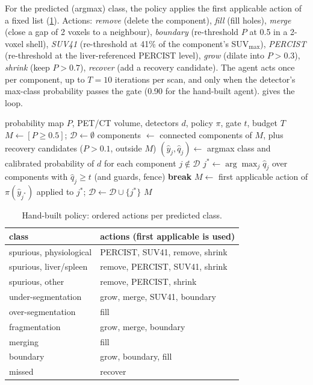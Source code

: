 For the predicted (argmax) class, the policy applies the first applicable action of a fixed list (\cref{tab:supp_policy}). Actions: \emph{remove} (delete the component), \emph{fill} (fill holes), \emph{merge} (close a gap of 2 voxels to a neighbour), \emph{boundary} (re-threshold $P$ at 0.5 in a 2-voxel shell), \emph{SUV41} (re-threshold at 41\% of the component's SUV$_{\max}$), \emph{PERCIST} (re-threshold at the liver-referenced PERCIST level), \emph{grow} (dilate into $P>0.3$), \emph{shrink} (keep $P>0.7$), \emph{recover} (add a recovery candidate).
The agent acts once per component, up to $T=10$ iterations per scan, and only when the detector's max-class probability passes the gate (0.90 for the hand-built agent).  gives the loop.

\begin{algorithm}[h]
\caption{Refinement agent (one scan)}
\label{alg:supp_agent}
\small
\begin{algorithmic}[1]
\Require probability map $P$, PET/CT volume, detectors $d$, policy $\pi$, gate $t$, budget $T$
\State $M\gets[P\ge0.5]$; $\mathcal{D}\gets\emptyset$ 
  \State components $\gets$ connected components of $M$, plus recovery candidates ($P>0.1$, outside $M$)
  \State $(\hat y_j,\hat q_j)\gets$ argmax class and calibrated probability of $d$ for each component $j\notin\mathcal{D}$
  \State $j^\ast\gets\arg\max_j \hat q_j$ over components with $\hat q_j\ge t$ (and guards, fence)
   \textbf{break} \EndIf
  \State $M\gets$ first applicable action of $\pi(\hat y_{j^\ast})$ applied to $j^\ast$; $\mathcal{D}\gets\mathcal{D}\cup\{j^\ast\}$
\EndFor
\State \Return $M$
\end{algorithmic}
\end{algorithm}

\begin{table}[h]
\centering
\caption{Hand-built policy: ordered actions per predicted class.}
\label{tab:supp_policy}
\footnotesize
\begin{tabular}{@{}ll@{}}
\toprule
class & actions (first applicable is used) \\
\midrule
spurious, physiological & PERCIST, SUV41, remove, shrink \\
spurious, liver/spleen & remove, PERCIST, SUV41, shrink \\
spurious, other & remove, PERCIST, shrink \\
under-segmentation & grow, merge, SUV41, boundary \\
over-segmentation & fill \\
fragmentation & grow, merge, boundary \\
merging & fill \\
boundary & grow, boundary, fill \\
missed & recover \\
\bottomrule
\end{tabular}
\end{table}

